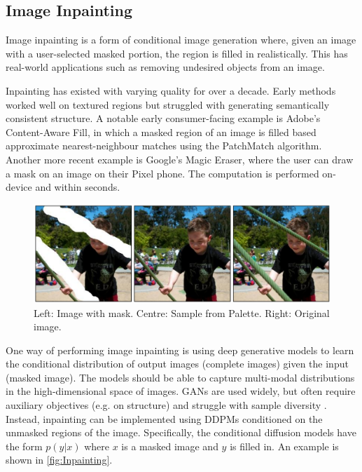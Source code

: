 \documentclass{article}
\begin{document}
\subsection{Image Inpainting}

Image inpainting is a form of conditional image generation where, given an image with a user-selected masked portion, the region is filled in realistically. This has real-world applications such as removing undesired objects from an image.

Inpainting has existed with varying quality for over a decade. Early methods worked well on textured regions but struggled with generating semantically consistent structure. A notable early consumer-facing example is Adobe's Content-Aware Fill, in which a masked region of an image is filled based approximate nearest-neighbour matches using the PatchMatch algorithm. Another more recent example is Google's Magic Eraser, where the user can draw a mask on an image on their Pixel phone. The computation is performed on-device and within seconds.

\begin{figure}[h]
\centering
\includegraphics[width=1\textwidth]{Inpainting.png}
\caption{Left: Image with mask. Centre: Sample from Palette. Right: Original image. \parencite{Saharia-2022}}
\label{fig:Inpainting}
\end{figure}

One way of performing image inpainting is using deep generative models to learn the conditional distribution of output images (complete images) given the input (masked image). The models should be able to capture multi-modal distributions in the high-dimensional space of images. GANs are used widely, but often require auxiliary objectives (e.g. on structure) and struggle with sample diversity \parencite{Saharia-2022}. Instead, inpainting can be implemented using DDPMs conditioned on the unmasked regions of the image. Specifically, the conditional diffusion models have the form $p(y|x)$ where $x$ is a masked image and $y$ is filled in. An example is shown in \autoref{fig:Inpainting}.
\end{document}
